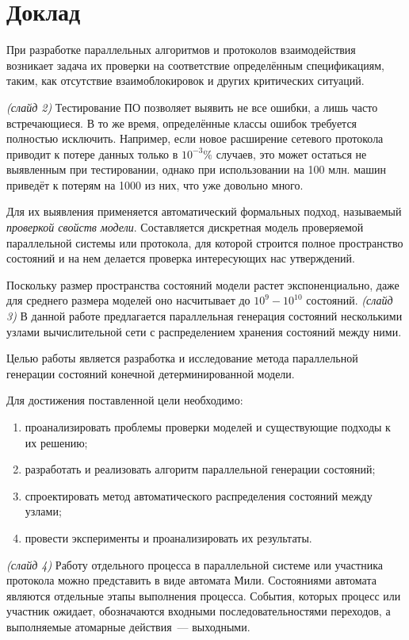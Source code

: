 \documentclass[a4paper,12pt,notitlepage]{article}
\begin{document}
\section{Доклад}


При разработке параллельных алгоритмов и протоколов взаимодействия возникает задача их
проверки на соответствие определённым спецификациям, таким, как отсутствие
взаимоблокировок и других критических ситуаций.

\emph{(слайд 2)} Тестирование ПО позволяет выявить не все ошибки, а лишь часто
встречающиеся. В то же время, определённые классы ошибок требуется полностью
исключить. Например, если новое расширение сетевого протокола приводит к потере данных
только в $10^{-3}\%$ случаев, это может остаться не выявленным при тестировании, однако
при использовании на 100 млн. машин приведёт к потерям на 1000 из них, что уже довольно
много.

Для их выявления применяется автоматический формальных подход, называемый \emph{проверкой
  свойств модели}. Составляется дискретная модель проверяемой параллельной системы или
протокола, для которой строится полное пространство состояний и на нем делается проверка
интересующих нас утверждений.

Поскольку размер пространства состояний модели растет экспоненциально, даже для среднего
размера моделей оно насчитывает до $10^9 - 10^{10}$ состояний. \emph{(слайд 3)} В данной
работе предлагается параллельная генерация состояний несколькими узлами вычислительной
сети с распределением хранения состояний между ними.

Целью работы является разработка и исследование метода параллельной генерации состояний
конечной детерминированной модели.

Для достижения поставленной цели необходимо:
\begin{enumerate}
\item проанализировать проблемы проверки моделей и существующие подходы к их решению;
\item разработать и реализовать алгоритм параллельной генерации состояний;
\item спроектировать метод автоматического распределения состояний между узлами;
\item провести эксперименты и проанализировать их результаты.
\end{enumerate}

\emph{(слайд 4)} Работу отдельного процесса в параллельной системе или участника протокола
можно представить в виде автомата Мили. Состояниями автомата являются отдельные этапы
выполнения процесса. События, которых процесс или участник ожидает, обозначаются входными
последовательностями переходов, а выполняемые атомарные действия~--- выходными.
\end{document}
